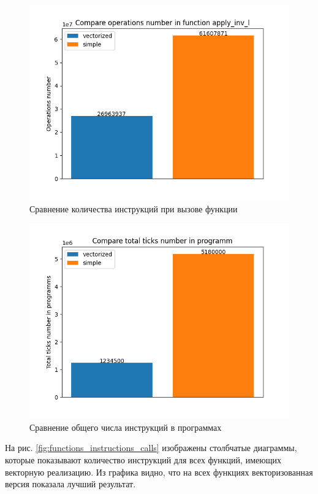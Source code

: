 \documentclass[a4paper, 12pt]{article}
\begin{document}
    \begin{figure}
        \centering
        \includegraphics{images/one_function_innstructions_calls.png}
        \caption{Сравнение количества инструкций при вызове функции }
        \label{fig:one_function_innstructions_calls}
    \end{figure}

    \begin{figure}
        \centering
        \includegraphics{images/total_ticks.png}
        \caption{Сравнение общего числа инструкций в программах}
        \label{fig:total_ticks}
    \end{figure}

    На рис. \ref{fig:functions_instructions_calls} изображены столбчатые 
    диаграммы, которые показывают количество инструкций для всех функций, имеющих векторную реализацию. Из графика видно, что на всех функциях векторизованная версия показала лучший результат.
\end{document}
